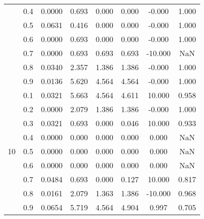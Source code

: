 \documentclass[11pt,a4paper]{report}
\begin{document}
\begin{longtable}{ | c | c || c | c | c | c | c | c | }
 & 0.4 & 0.0000 & 0.693 & 0.000 & 0.000 & -0.000 & 1.000 \\
 & 0.5 & 0.0631 & 0.416 & 0.000 & 0.000 & -0.000 & 1.000 \\
 & 0.6 & 0.0000 & 0.693 & 0.000 & 0.000 & -0.000 & 1.000 \\
 & 0.7 & 0.0000 & 0.693 & 0.693 & 0.693 & -10.000 & NaN \\
 & 0.8 & 0.0340 & 2.357 & 1.386 & 1.386 & -0.000 & 1.000 \\
 & 0.9 & 0.0136 & 5.620 & 4.564 & 4.564 & -0.000 & 1.000 \\
 \hline
\multirow{9}{*}{10} & 0.1 & 0.0321 & 5.663 & 4.564 & 4.611 & 10.000 & 0.958 \\
 & 0.2 & 0.0000 & 2.079 & 1.386 & 1.386 & -0.000 & 1.000 \\
 & 0.3 & 0.0321 & 0.693 & 0.000 & 0.046 & 10.000 & 0.933 \\
 & 0.4 & 0.0000 & 0.000 & 0.000 & 0.000 & 0.000 & NaN \\
 & 0.5 & 0.0000 & 0.000 & 0.000 & 0.000 & 0.000 & NaN \\
 & 0.6 & 0.0000 & 0.000 & 0.000 & 0.000 & 0.000 & NaN \\
 & 0.7 & 0.0484 & 0.693 & 0.000 & 0.127 & 10.000 & 0.817 \\
 & 0.8 & 0.0161 & 2.079 & 1.363 & 1.386 & -10.000 & 0.968 \\
 & 0.9 & 0.0654 & 5.719 & 4.564 & 4.904 & 0.997 & 0.705 \\
 \hline
\hline
\end{longtable}
\end{document}
